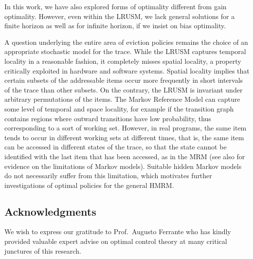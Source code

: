 \documentclass[11pt,a4paper]{article}
\theoremstyle{definition}
\theoremstyle{remark}
\begin{document}
In this work, we have also explored forms of optimality different from
gain optimality. However, even within the LRUSM, we lack general
solutions for a finite horizon as well as for infinite horizon, if we
insist on bias optimality.

A question underlying the entire area of eviction policies remains the
choice of an appropriate stochastic model for the trace. While the
LRUSM captures temporal locality in a reasonable fashion, it
completely misses spatial locality, a property critically exploited in
hardware and software systems. Spatial locality implies that certain
subsets of the addressable items occur more frequently in short
intervals of the trace than other subsets. On the contrary, the LRUSM
is invariant under arbitrary permutations of the items. The Markov
Reference Model can capture some level of temporal and space locality,
for example if the transition graph contains regions where outward
transitions have low probability, thus corresponding to a sort of
working set. However, in real programs, the same item tends to occur
in different working sets at different times, that is, the same item
can be accessed in different states of the trace, so that the state
cannot be identified with the last item that has been accessed, as in
the MRM (see also \cite{Liberatore99} for evidence on the limitations
of Markov models). Suitable hidden Markov models do not necessarily
suffer from this limitation, which motivates further investigations of
optimal policies for the general HMRM.


\subsection*{Acknowledgments}
We wish to express our gratitude to Prof.\ Augusto Ferrante who has kindly
provided valuable expert advise on optimal control theory at many critical
junctures of this research. 



\clearpage


\appendix
\end{document}
